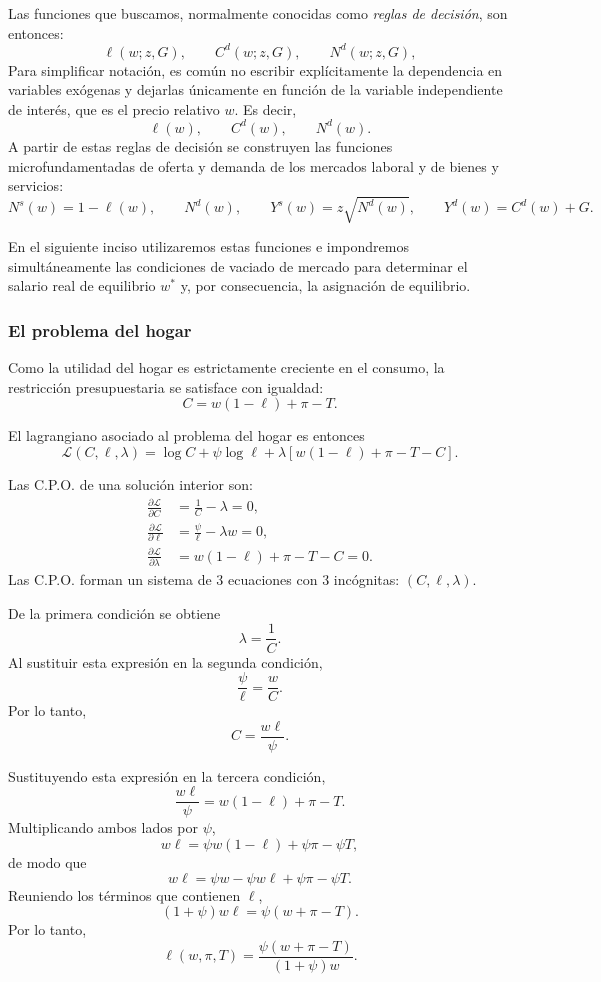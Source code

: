 \documentclass[11pt]{article}
\begin{document}
Las funciones que buscamos, normalmente conocidas como \textit{reglas de decisión}, son entonces:
\[
\ell(w; z, G), \qquad C^d(w; z, G), \qquad  N^d(w; z, G),
\]
Para simplificar notación, es común no escribir explícitamente la dependencia en variables exógenas y dejarlas únicamente en función de la variable independiente de interés, que es el precio relativo $w$. Es decir,
$$
\ell(w), \qquad C^d(w), \qquad  N^d(w).
$$
A partir de estas reglas de decisión se construyen las funciones microfundamentadas de oferta y demanda de los mercados laboral y de bienes y servicios:
\[
N^s(w) = 1 - \ell(w),\qquad N^d(w),\qquad
Y^s(w) = z \sqrt{N^d(w)},\qquad Y^d(w)=C^d(w)+G.
\]

En el siguiente inciso utilizaremos estas funciones e impondremos simultáneamente las condiciones de vaciado de mercado para determinar el salario real de equilibrio \(w^*\) y, por consecuencia, la asignación de equilibrio.


\medskip

\subsubsection*{El problema del hogar}

Como la utilidad del hogar es estrictamente creciente en el consumo, la restricción presupuestaria se satisface con igualdad:
\[
C=w(1-\ell)+\pi-T.
\]

El lagrangiano asociado al problema del hogar es entonces
\[
\mathcal L(C,\ell,\lambda)
=
\log C+\psi\log\ell
+\lambda\left[w(1-\ell)+\pi-T-C\right].
\]

Las C.P.O. de una solución interior son:
\begin{align*}
\frac{\partial\mathcal L}{\partial C}
&=\frac{1}{C}-\lambda=0,\\
\frac{\partial\mathcal L}{\partial\ell}
&=\frac{\psi}{\ell}-\lambda w=0,\\
\frac{\partial\mathcal L}{\partial\lambda}
&=w(1-\ell)+\pi-T-C=0.
\end{align*}
Las C.P.O. forman un sistema de 3 ecuaciones con 3 incógnitas: $(C, \ell, \lambda)$.

De la primera condición se obtiene
\[
\lambda=\frac{1}{C}.
\]
Al sustituir esta expresión en la segunda condición,
\[
\frac{\psi}{\ell}=\frac{w}{C}.
\]
Por lo tanto,
\begin{equation}
  C=\frac{w\ell}{\psi}.\label{eq:c_1}
\end{equation}


Sustituyendo esta expresión en la tercera condición,
\[
\frac{w\ell}{\psi}=w(1-\ell)+\pi-T.
\]
Multiplicando ambos lados por \(\psi\),
\[
w\ell=\psi w(1-\ell)+\psi\pi-\psi T,
\]
de modo que
\[
w\ell=\psi w-\psi w\ell+\psi\pi-\psi T.
\]
Reuniendo los términos que contienen \(\ell\),
\[
(1+\psi)w\ell=\psi(w+\pi-T).
\]
Por lo tanto,
\begin{equation}
\ell(w,\pi,T)
=
\frac{\psi(w+\pi-T)}{(1+\psi)w}. \label{eq:ell_p}
\end{equation}
\end{document}
